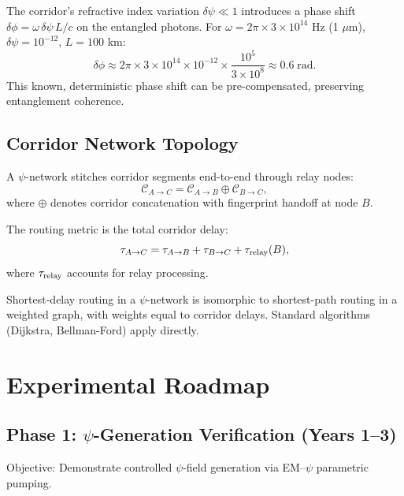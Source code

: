 \documentclass[twocolumn,superscriptaddress,prd,nofootinbib]{revtex4-2}
\newcommand{\Corridor}{\mathcal{C}}
\begin{document}
The corridor's refractive index variation $\delta\psi \ll 1$ introduces
a phase shift $\delta\phi = \omega\,\delta\psi\,L/c$ on the entangled
photons.
For $\omega = 2\pi \times 3 \times 10^{14}$ Hz (1 $\mu$m),
$\delta\psi = 10^{-12}$, $L = 100$ km:
\begin{equation}
\delta\phi \approx 2\pi \times 3 \times 10^{14} \times 10^{-12}
\times \frac{10^5}{3\times 10^8} \approx 0.6\;\text{rad}.
\label{eq:quantum-phase}
\end{equation}
This known, deterministic phase shift can be pre-compensated, preserving
entanglement coherence.

\subsection{Corridor Network Topology}

A $\psi$-network stitches corridor segments end-to-end through relay
nodes:
\begin{equation}
\Corridor_{A \to C} = \Corridor_{A \to B} \oplus \Corridor_{B \to C},
\label{eq:route-stitch}
\end{equation}
where $\oplus$ denotes corridor concatenation with fingerprint
handoff at node $B$.

The routing metric is the total corridor delay:
\begin{equation}
\tau_{A \to C} = \tau_{A \to B} + \tau_{B \to C} +
\tau_{\rm relay}(B),
\label{eq:route-delay}
\end{equation}
where $\tau_{\rm relay}$ accounts for relay processing.

Shortest-delay routing in a $\psi$-network is isomorphic to
shortest-path routing in a weighted graph, with weights equal to
corridor delays.
Standard algorithms (Dijkstra, Bellman-Ford) apply directly.

\section{Experimental Roadmap}\label{sec:roadmap}

\subsection{Phase 1: $\psi$-Generation Verification (Years 1--3)}

Objective: Demonstrate controlled $\psi$-field generation via EM--$\psi$
parametric pumping.
\end{document}
